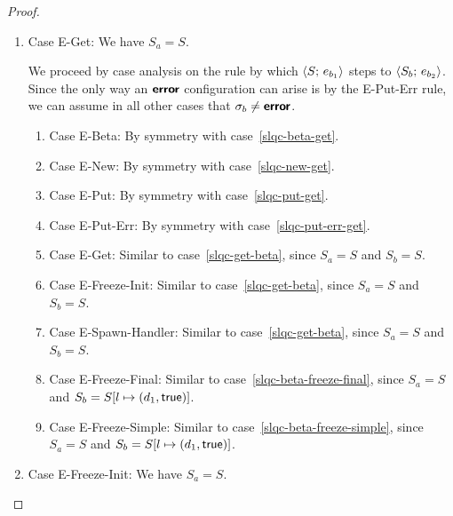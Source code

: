 \begin{proof}
\begin{enumerate}
\begin{enumerate}
    \end{enumerate}
  \item Case {\sc E-Get}: We have $S_a = S$.

    We proceed by case analysis on the rule by which
    $\langle S;\, e_{b_1} \rangle$ steps to $\langle S_b;\, e_{b_2} \rangle$.  Since the
    only way an $\textbf{\textsf{error}}$ configuration can arise is by the {\sc
      E-Put-Err} rule, we can assume in all other cases that $\sigma_b
    \neq \textbf{\textsf{error}}$.
    \begin{enumerate}
    \item \label{slqc-get-beta}Case {\sc E-Beta}: By symmetry with case~\ref{slqc-beta-get}.
    \item \label{slqc-get-new}Case {\sc E-New}: By symmetry with case~\ref{slqc-new-get}.
    \item \label{slqc-get-put}Case {\sc E-Put}: By symmetry with case~\ref{slqc-put-get}.
    \item \label{slqc-get-put-err}Case {\sc E-Put-Err}: By symmetry with case~\ref{slqc-put-err-get}.
    \item \label{slqc-get-get}Case {\sc E-Get}: Similar to
      case~\ref{slqc-get-beta}, since $S_a = S$ and $S_b = S$.
    \item \label{slqc-get-freeze-init}Case {\sc E-Freeze-Init}:
      Similar to case~\ref{slqc-get-beta}, since $S_a = S$ and $S_b = S$.
    \item \label{slqc-get-spawn-handler}Case {\sc E-Spawn-Handler}:
      Similar to case~\ref{slqc-get-beta}, since $S_a = S$ and $S_b = S$.
    \item \label{slqc-get-freeze-final}Case {\sc E-Freeze-Final}:
      Similar to case~\ref{slqc-beta-freeze-final}, since $S_a = S$
      and $S_b = S[l \mapsto (d_1, \textsf{true})]$.
    \item \label{slqc-get-freeze-simple}Case {\sc E-Freeze-Simple}:
      Similar to case~\ref{slqc-beta-freeze-simple}, since $S_a = S$
      and $S_b = S[l \mapsto (d_1, \textsf{true})]$.
    \end{enumerate}

  \item Case {\sc E-Freeze-Init}: We have $S_a = S$.


\end{enumerate}
\end{proof}
